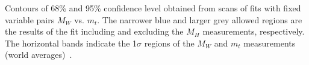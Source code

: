 Contours of 68\% and 95\% confidence level obtained 
from scans of fits with fixed variable pairs 
$M_W$ vs. $m_t$. The narrower blue and larger 
grey allowed regions are the results of the 
fit including and excluding the $M_H$ measurements, 
respectively. The horizontal bands indicate the 1$\sigma$
regions of the $M_W$ and $m_t$ measurements (world averages)~\cite{Baak:2012kk}. 
